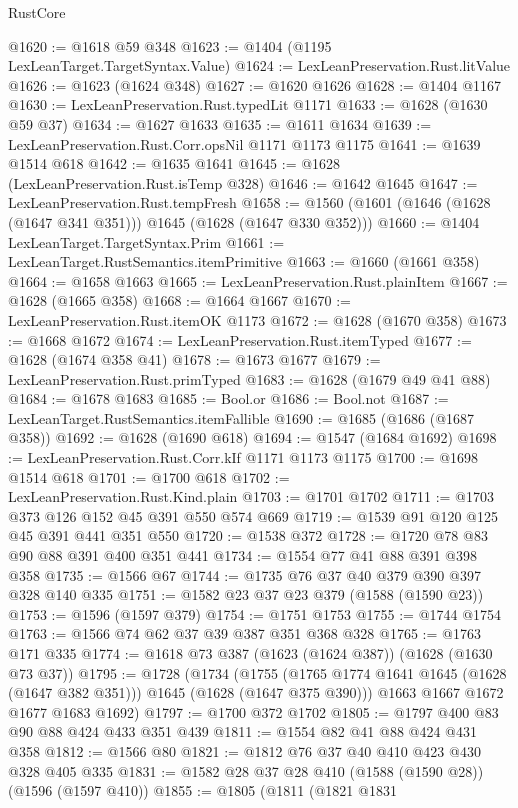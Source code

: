 \begin{lexlean}{RustCore}
\begin{coremodule}
@1620 := @1618 @59 @348
@1623 := @1404 (@1195 LexLeanTarget.TargetSyntax.Value)
@1624 := LexLeanPreservation.Rust.litValue
@1626 := @1623 (@1624 @348)
@1627 := @1620 @1626
@1628 := @1404 @1167
@1630 := LexLeanPreservation.Rust.typedLit @1171
@1633 := @1628 (@1630 @59 @37)
@1634 := @1627 @1633
@1635 := @1611 @1634
@1639 := LexLeanPreservation.Rust.Corr.opsNil @1171 @1173 @1175
@1641 := @1639 @1514 @618
@1642 := @1635 @1641
@1645 := @1628 (LexLeanPreservation.Rust.isTemp @328)
@1646 := @1642 @1645
@1647 := LexLeanPreservation.Rust.tempFresh
@1658 := @1560 (@1601 (@1646 (@1628 (@1647 @341 @351))) @1645 (@1628 (@1647 @330 @352)))
@1660 := @1404 LexLeanTarget.TargetSyntax.Prim
@1661 := LexLeanTarget.RustSemantics.itemPrimitive
@1663 := @1660 (@1661 @358)
@1664 := @1658 @1663
@1665 := LexLeanPreservation.Rust.plainItem
@1667 := @1628 (@1665 @358)
@1668 := @1664 @1667
@1670 := LexLeanPreservation.Rust.itemOK @1173
@1672 := @1628 (@1670 @358)
@1673 := @1668 @1672
@1674 := LexLeanPreservation.Rust.itemTyped
@1677 := @1628 (@1674 @358 @41)
@1678 := @1673 @1677
@1679 := LexLeanPreservation.Rust.primTyped
@1683 := @1628 (@1679 @49 @41 @88)
@1684 := @1678 @1683
@1685 := Bool.or
@1686 := Bool.not
@1687 := LexLeanTarget.RustSemantics.itemFallible
@1690 := @1685 (@1686 (@1687 @358))
@1692 := @1628 (@1690 @618)
@1694 := @1547 (@1684 @1692)
@1698 := LexLeanPreservation.Rust.Corr.kIf @1171 @1173 @1175
@1700 := @1698 @1514 @618
@1701 := @1700 @618
@1702 := LexLeanPreservation.Rust.Kind.plain
@1703 := @1701 @1702
@1711 := @1703 @373 @126 @152 @45 @391 @550 @574 @669
@1719 := @1539 @91 @120 @125 @45 @391 @441 @351 @550
@1720 := @1538 @372
@1728 := @1720 @78 @83 @90 @88 @391 @400 @351 @441
@1734 := @1554 @77 @41 @88 @391 @398 @358
@1735 := @1566 @67
@1744 := @1735 @76 @37 @40 @379 @390 @397 @328 @140 @335
@1751 := @1582 @23 @37 @23 @379 (@1588 (@1590 @23))
@1753 := @1596 (@1597 @379)
@1754 := @1751 @1753
@1755 := @1744 @1754
@1763 := @1566 @74 @62 @37 @39 @387 @351 @368 @328
@1765 := @1763 @171 @335
@1774 := @1618 @73 @387 (@1623 (@1624 @387)) (@1628 (@1630 @73 @37))
@1795 := @1728
    (@1734
      (@1755 (@1765 @1774 @1641 @1645 (@1628 (@1647 @382 @351))) @1645 (@1628 (@1647 @375 @390)))
      @1663
      @1667
      @1672
      @1677
      @1683
      @1692)
@1797 := @1700 @372 @1702
@1805 := @1797 @400 @83 @90 @88 @424 @433 @351 @439
@1811 := @1554 @82 @41 @88 @424 @431 @358
@1812 := @1566 @80
@1821 := @1812 @76 @37 @40 @410 @423 @430 @328 @405 @335
@1831 := @1582 @28 @37 @28 @410 (@1588 (@1590 @28)) (@1596 (@1597 @410))
@1855 := @1805
    (@1811
      (@1821
        @1831

\end{coremodule}
\end{lexlean}
